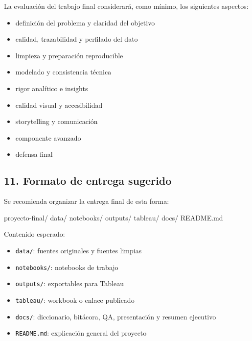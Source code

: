 \documentclass[
]{article}
\newenvironment{Shaded}{}{}
\newcommand{\NormalTok}[1]{#1}
\providecommand{\tightlist}{%
  \setlength{\itemsep}{0pt}\setlength{\parskip}{0pt}}
\begin{document}
La evaluación del trabajo final considerará, como mínimo, los siguientes
aspectos:

\begin{itemize}
\tightlist
\item
  definición del problema y claridad del objetivo
\item
  calidad, trazabilidad y perfilado del dato
\item
  limpieza y preparación reproducible
\item
  modelado y consistencia técnica
\item
  rigor analítico e insights
\item
  calidad visual y accesibilidad
\item
  storytelling y comunicación
\item
  componente avanzado
\item
  defensa final
\end{itemize}

\subsection{11. Formato de entrega
sugerido}\label{11-formato-de-entrega-sugerido}

Se recomienda organizar la entrega final de esta forma:

\begin{Shaded}
\begin{Highlighting}[]
\NormalTok{proyecto{-}final/}
\NormalTok{  data/}
\NormalTok{  notebooks/}
\NormalTok{  outputs/}
\NormalTok{  tableau/}
\NormalTok{  docs/}
\NormalTok{  README.md}
\end{Highlighting}
\end{Shaded}

Contenido esperado:

\begin{itemize}
\tightlist
\item
  \texttt{data/}: fuentes originales y fuentes limpias
\item
  \texttt{notebooks/}: notebooks de trabajo
\item
  \texttt{outputs/}: exportables para Tableau
\item
  \texttt{tableau/}: workbook o enlace publicado
\item
  \texttt{docs/}: diccionario, bitácora, QA, presentación y resumen
  ejecutivo
\item
  \texttt{README.md}: explicación general del proyecto
\end{itemize}
\end{document}
